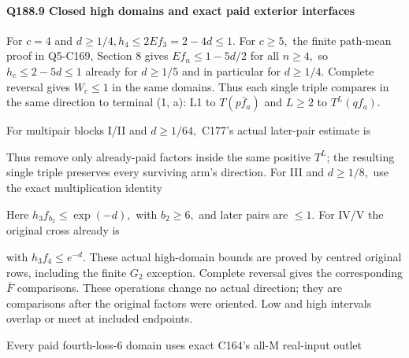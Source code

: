 \paragraph{Q188.9 Closed high domains and exact paid exterior interfaces}

For \(c=4\) and \(d\ge 1/4,\allowbreak \allowbreak   h_4\le 2E f_3=2-4d\le 1\). For \(c\ge 5,\allowbreak \allowbreak  \) the finite path-mean proof in Q5-C169, Section 8 gives \(E f_n\le 1-5d/2\) for all \(n\ge 4,\allowbreak \allowbreak  \) so \(h_c\le 2-5d\le 1\) already for \(d\ge 1/5\) and in particular for \(d\ge 1/4.\) Complete reversal gives \(W_c\le 1\) in the same domains. Thus each single triple compares in the same direction to terminal (1, a): L1 to \(T(p \bar f_a)\) and \(L\ge 2\) to \(T^L(q f_a)\).

For multipair blocks I/II and \(d\ge 1/64,\allowbreak \allowbreak  \) C177's actual later-pair estimate is



Thus remove only already-paid factors inside the same positive \(T^L\); the resulting single triple preserves every surviving arm's direction. For III and \(d\ge 1/8,\allowbreak \allowbreak  \) use the exact multiplication identity



Here \(h_3 f_{b_2}\le \exp(-d),\allowbreak \allowbreak  \) with \(b_2\ge 6,\allowbreak \allowbreak  \) and later pairs are \(\le1\). For IV/V the original cross already is



with \(h_3f_4\le e^{-d}\). These actual high-domain bounds are proved by centred original rows, including the finite \(G_{2}\) exception. Complete reversal gives the corresponding \(\bar F\) comparisons. These operations change no actual direction; they are comparisons after the original factors were oriented. Low and high intervals overlap or meet at included endpoints.

Every paid fourth-loss-6 domain uses exact C164's all-M real-input outlet



